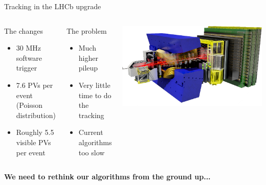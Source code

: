 \begin{frame}{Tracking in the LHCb upgrade}
  \begin{columns}[c]
    \begin{block}{The changes}
      \begin{itemize}
          \item 30 MHz software trigger
          \item 7.6 PVs per event (Poisson distribution)
          \item Roughly 5.5 visible PVs per event
      \end{itemize}
    \end{block}
    \begin{block}{The problem}
    \begin{itemize}
    	\item Much higher pileup
    	\item Very little time to do the tracking
    	\item Current algorithms too slow
    \end{itemize}
    \end{block}
      \begin{center}
    \includegraphics[width=\textwidth, trim=18 0 18 0]{images/LHCbDet.png}
  \end{center}
  \end{columns}

  \vspace{1em}
  \begin{center}
    \textbf{We need to rethink our algorithms from the ground up...}
  \end{center}
\end{frame}
